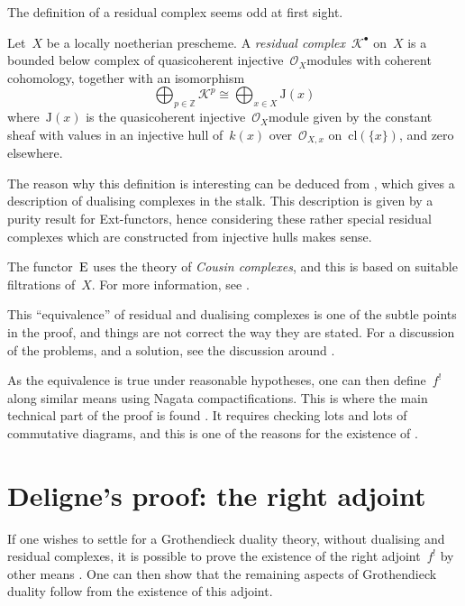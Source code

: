 \documentclass[10pt,a4paper]{article}
\begin{document}
The definition of a residual complex seems odd at first sight.
\begin{definition}
  Let~$X$ be a locally noetherian prescheme. A \emph{residual complex}~$\mathcal{K}^\bullet$ on~$X$ is a bounded below complex of quasicoherent injective~$\mathcal{O}_X$\dash modules with coherent cohomology, together with an isomorphism
  \begin{equation}
    \bigoplus_{p\in\mathbb{Z}}\mathcal{K}^p\cong\bigoplus_{x\in X}\mathrm{J}(x)
  \end{equation}
  where~$\mathrm{J}(x)$ is the quasicoherent injective~$\mathcal{O}_X$\dash module given by the constant sheaf with values in an injective hull of~$k(x)$ over~$\mathcal{O}_{X,x}$ on~$\mathrm{cl}(\{x\})$, and zero elsewhere.
\end{definition}
The reason why this definition is interesting can be deduced from \cite[proposition V.3.4]{hartshorne-residues-and-duality}, which gives a description of dualising complexes in the stalk. This description is given by a purity result for Ext-functors, hence considering these rather special residual complexes which are constructed from injective hulls makes sense.

The functor~$\operatorname{E}$ uses the theory of \emph{Cousin complexes}, and this is based on suitable filtrations of~$X$. For more information, see \cite[chapter IV]{hartshorne-residues-and-duality}.

This ``equivalence'' of residual and dualising complexes is one of the subtle points in the proof, and things are not correct the way they are stated. For a discussion of the problems, and a solution, see the discussion around \cite[lemma 3.2.1]{conrad-grothendieck-duality-and-base-change}.

As the equivalence is true under reasonable hypotheses, one can then define~$f^!$ along similar means using Nagata compactifications. This is where the main technical part of the proof is found \cite[\S VI.2--VI.5]{hartshorne-residues-and-duality}. It requires checking lots and lots of commutative diagrams, and this is one of the reasons for the existence of \cite{conrad-grothendieck-duality-and-base-change}.


\section{Deligne's proof: the right adjoint}
\label{section:deligne}
If one wishes to settle for a Grothendieck duality theory, without dualising and residual complexes, it is possible to prove the existence of the right adjoint~$f^!$ by other means \cite{deligne-appendix-f-upper-shriek,verdier-base-change-twisted-inverse-image}. One can then show that the remaining aspects of Grothendieck duality follow from the existence of this adjoint.
\end{document}
